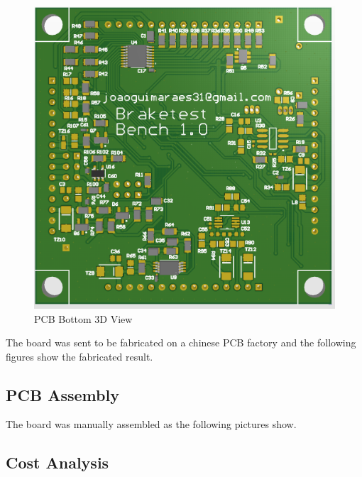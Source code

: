 		\begin{figure}[htbp]
			\centering
			\includegraphics[scale=0.7]{figuras/fig-pcb-print-bottom}
			\caption{PCB Bottom 3D View \cite{pcb-print-bot}}
			\label{fig:pcb-print-bottom}
		\end{figure}

		The board was sent to be fabricated on a chinese PCB factory and the following figures show the fabricated result.


	\subsection{PCB Assembly}\label{ssec:pcb-assembly}

		The board was manually assembled as the following pictures show.

	\subsection{Cost Analysis}

